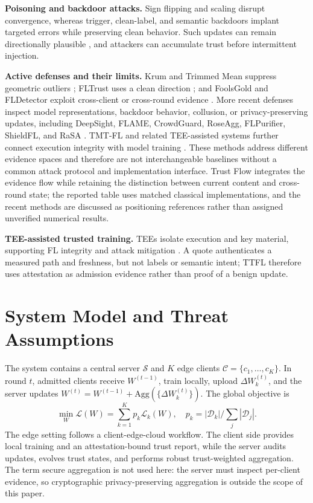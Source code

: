 \documentclass[runningheads,orivec]{llncs}
\begin{document}
\textbf{Poisoning and backdoor attacks.} Sign flipping and scaling disrupt convergence, whereas trigger, clean-label, and semantic backdoors implant targeted errors while preserving clean behavior. Such updates can remain directionally plausible \cite{bagdasaryan2020backdoor,wang2019neuralcleanse}, and attackers can accumulate trust before intermittent injection.

\textbf{Active defenses and their limits.} Krum and Trimmed Mean suppress geometric outliers \cite{blanchard2017krum,yin2018byzantine}; FLTrust uses a clean direction \cite{cao2021fltrust}; and FoolsGold and FLDetector exploit cross-client or cross-round evidence \cite{fung2020foolsgold,fldetector2022}. More recent defenses inspect model representations, backdoor behavior, collusion, or privacy-preserving updates, including DeepSight, FLAME, CrowdGuard, RoseAgg, FLPurifier, ShieldFL, and RaSA \cite{deepsight2022,flame2022,crowdguard2024,roseagg,flpurifier,shieldfl,wang2025rasa}. TMT-FL and related TEE-assisted systems further connect execution integrity with model training \cite{lu2025tmt}. These methods address different evidence spaces and therefore are not interchangeable baselines without a common attack protocol and implementation interface. Trust Flow integrates the evidence flow while retaining the distinction between current content and cross-round state; the reported table uses matched classical implementations, and the recent methods are discussed as positioning references rather than assigned unverified numerical results.

\textbf{TEE-assisted trusted training.} TEEs isolate execution and key material, supporting FL integrity and attack mitigation \cite{r1_tee_integrity,xu2021distributed,zhang2025rppfl,r5_tee_mitigating,lu2025tmt}. A quote authenticates a measured path and freshness, but not labels or semantic intent; TTFL therefore uses attestation as admission evidence rather than proof of a benign update.

\section{System Model and Threat Assumptions}

The system contains a central server $\mathcal{S}$ and $K$ edge clients $\mathcal{C}=\{c_1,\ldots,c_K\}$. In round $t$, admitted clients receive $W^{(t-1)}$, train locally, upload $\Delta W_k^{(t)}$, and the server updates $W^{(t)}=W^{(t-1)}+\mathrm{Agg}(\{\Delta W_k^{(t)}\})$. The global objective is
\begin{equation}
    \min_W \mathcal{L}(W)=\sum_{k=1}^{K}p_k\mathcal{L}_k(W),\quad
    p_k=|\mathcal{D}_k|/\sum_j|\mathcal{D}_j|.
\end{equation}
The edge setting follows a client-edge-cloud workflow. The client side provides local training and an attestation-bound trust report, while the server audits updates, evolves trust states, and performs robust trust-weighted aggregation. The term secure aggregation is not used here: the server must inspect per-client evidence, so cryptographic privacy-preserving aggregation is outside the scope of this paper.
\end{document}
